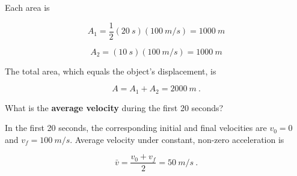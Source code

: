 \documentclass[addpoints]{exam}
\begin{document}
\begin{questions}
\begin{solutionorbox}[2.5in]
Each area is

\begin{equation*}
    A_1 = \frac{1}{2}\left(\SI{20}{s}\right)\left(\SI{100}{m/s}\right) = \SI{1000}{m}
\end{equation*}

\begin{equation*}
    A_2 = (\SI{10}{s})(\SI{100}{m/s}) = \SI{1000}{m}
\end{equation*}

The total area, which equals the object's displacement, is

\begin{equation*}
    A = A_1 + A_2 = \SI{2000}{m}\ .
\end{equation*}

\end{solutionorbox}


\question
What is the \textbf{average velocity} during the first 20 seconds?

\begin{solutionorbox}[2.5in]

In the first 20 seconds, the corresponding initial and final velocities are $v_0 = 0$ and $v_f = \SI{100}{m/s}$. Average velocity under constant, non-zero acceleration is

\begin{equation*}
    \bar{v} = \frac{v_0 + v_f}{2} = \SI{50}{m/s}\ .
\end{equation*}

\end{solutionorbox}

\end{questions}
\end{document}
